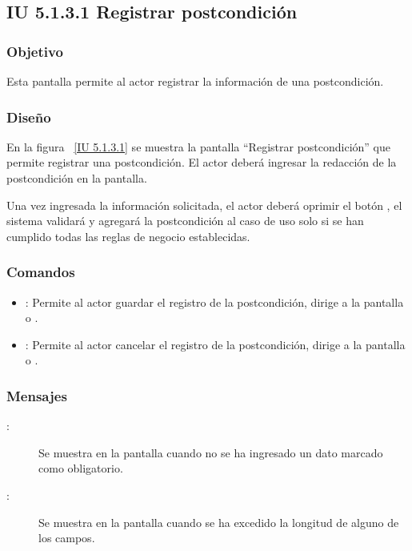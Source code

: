 \subsection{IU 5.1.3.1 Registrar postcondición}

\subsubsection{Objetivo}
	
	Esta pantalla permite al actor registrar la información de una postcondición.

\subsubsection{Diseño}

    En la figura ~\ref{IU 5.1.3.1} se muestra la pantalla ``Registrar postcondición'' que permite registrar una postcondición. El actor deberá ingresar la redacción de la postcondición en la pantalla.
    
    Una vez ingresada la información solicitada, el actor deberá oprimir el botón , el sistema validará y agregará la postcondición al caso de uso
    solo si se han cumplido todas las reglas de negocio establecidas.  \\
    




\subsubsection{Comandos}
\begin{itemize}
	\item {}: Permite al actor guardar el registro de la postcondición, dirige a la pantalla  o .
	\item {}: Permite al actor cancelar el registro de la postcondición, dirige a la pantalla  o .
\end{itemize}

\subsubsection{Mensajes}

	
\begin{description}
	\item[ :] Se muestra en la pantalla  cuando no se ha ingresado un dato marcado como obligatorio.
	\item[ :] Se muestra en la pantalla  cuando se ha excedido la longitud de alguno de los campos.
\end{description}

